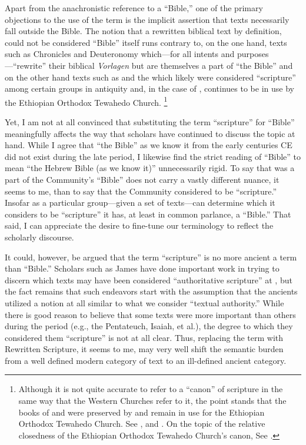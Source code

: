 Apart from the anachronistic reference to a ``Bible,'' one of the primary objections to the use of the term \rwb is the implicit assertion that \rwb texts necessarily fall outside the Bible.%
    \autocite[61]{campbell_zsengeller2014}
The notion that a rewritten biblical text by definition, could not be considered ``Bible'' itself runs contrary to, on the one hand, texts such as Chronicles and Deuteronomy which---for all intents and purposes---``rewrite'' their biblical \emph{Vorlagen} but are themselves a part of ``the Bible'' and on the other hand texts such as \jub and the \templescroll which likely were considered ``scripture'' among certain groups in antiquity and, in the case of \jub, continues to be in use by the Ethiopian Orthodox Tewahedo Church.%
    \footnote{Although it is not quite accurate to refer to a ``canon'' of scripture in the same way that the Western Churches refer to it, the point stands that the books of \enoch and \jub were preserved by and remain in use for the Ethiopian Orthodox Tewahedo Church. See \cite{baynes_mason-etal2012}, \cite{asale_js2013} and \cite{cowley_os1974}. On the topic of the relative closedness of the Ethiopian Orthodox Tewahedo Church's canon, See \cite{asale_bt2016}.}

Yet, I am not at all convinced that substituting the term ``scripture'' for ``Bible'' meaningfully affects the way that scholars have continued to discuss the topic at hand. While I agree that ``the Bible'' as we know it from the early centuries CE did not exist during the late \secondtemple period, I likewise find the strict reading of ``Bible'' to mean ``the Hebrew Bible (as we know it)'' unnecessarily rigid. To say that \jub was a part of the \qumran Community's ``Bible'' does not carry a vastly different nuance, it seems to me, than to say that the \qumran Community considered \jub to be ``scripture.'' Insofar as a particular group---given a set of texts---can determine which it considers to be ``scripture'' it has, at least in common parlance, a ``Bible.'' That said, I can appreciate the desire to fine-tune our terminology to reflect the scholarly discourse. 

It could, however, be argued that the term ``scripture'' is no more ancient a term than ``Bible.'' Scholars such as James \vanderkam have done important work in trying to discern which texts may have been considered ``authoritative scripture'' at \qumran,%
    \autocite{vanderkam_dsd1998}
but the fact remains that such endeavors start with the assumption that the ancients utilized a notion at all similar to what we consider ``textual authority.'' While there is good reason to believe that some texts were more important than others during the \secondtemple period (e.g., the Pentateuch, Isaiah, et al.), the degree to which they considered them ``scripture'' is not at all clear.  Thus, replacing the term \rwb with Rewritten Scripture, it seems to me, may very well shift the semantic burden from a well defined modern category of text to an ill-defined ancient category. 

